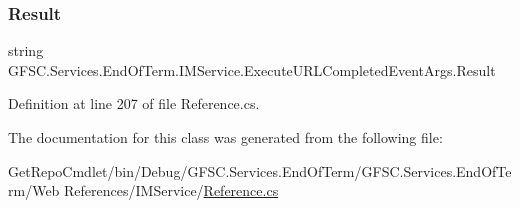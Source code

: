 \subsubsection{\texorpdfstring{Result}{Result}}
{\footnotesize\ttfamily string G\+F\+S\+C.\+Services.\+End\+Of\+Term.\+I\+M\+Service.\+Execute\+U\+R\+L\+Completed\+Event\+Args.\+Result\hspace{0.3cm}{\ttfamily [get]}}







Definition at line 207 of file Reference.\+cs.



The documentation for this class was generated from the following file\+:\begin{DoxyCompactItemize}
\item 
Get\+Repo\+Cmdlet/bin/\+Debug/\+G\+F\+S\+C.\+Services.\+End\+Of\+Term/\+G\+F\+S\+C.\+Services.\+End\+Of\+Term/\+Web References/\+I\+M\+Service/\mbox{\hyperlink{_reference_8cs}{Reference.\+cs}}\end{DoxyCompactItemize}
